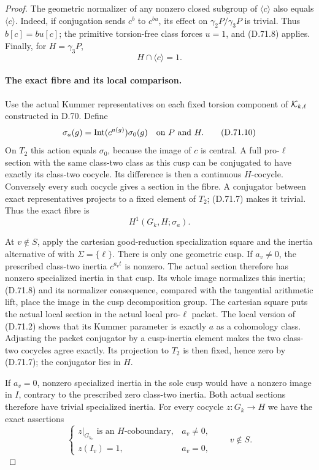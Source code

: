 \begin{proof}
The geometric normalizer of any nonzero
closed subgroup of \(\langle c\rangle\)
also equals \(\langle c\rangle\).
Indeed, if conjugation sends \(c^b\)
to \(c^{bu}\), its effect on
\(\gamma_2P/\gamma_3P\) is trivial.
Thus \(b[c]=bu[c]\); the primitive
torsion-free class forces \(u=1\),
and (D.71.8) applies.
Finally, for \(H=\gamma_3P\),
\[
                 H\cap\langle c\rangle=1.              \tag{D.71.9}
\]

\paragraph{The exact fibre and its local comparison.}
Use the actual Kummer representatives
on each fixed torsion component of
\({\cal K}_{k,\ell}\) constructed in
D.70. Define
\[
       \sigma_a(g)=\operatorname{Int}(c^{a(g)})\sigma_0(g)
                         \quad\hbox{on }P\hbox{ and }H.
                                                        \tag{D.71.10}
\]
On \(T_2\) this action equals \(\sigma_0\),
because the image of \(c\) is central.
A full pro-\(\ell\) section with the
same class-two class as this cusp can
be conjugated to have exactly its
class-two cocycle. Its difference is
then a continuous \(H\)-cocycle.
Conversely every such cocycle gives
a section in the fibre. A conjugator
between exact representatives projects
to a fixed element of \(T_2\); (D.71.7)
makes it trivial. Thus the exact fibre is
\[
                         H^1(G_k,H;\sigma_a).          \tag{D.71.11}
\]

At \(v\notin S\), apply the cartesian
good-reduction specialization square
and the inertia alternative of
\cite[Definition A.3, Remark A.3.1 and Proposition A.6]
{DE_Hoshi2012} with \(\Sigma=\{\ell\}\).
There is only one geometric cusp.
If \(a_v\ne0\), the prescribed
class-two inertia \(c^{a_v t}\)
is nonzero. The actual section
therefore has nonzero specialized
inertia in that cusp. Its whole
image normalizes this inertia;
(D.71.8) and its normalizer
consequence, compared with the
tangential arithmetic lift, place
the image in the cusp decomposition
group. The cartesian square puts
the actual local section in the
actual local pro-\(\ell\) packet.
The local version of (D.71.2)
shows that its Kummer parameter
is exactly \(a\) as a cohomology
class. Adjusting the packet
conjugator by a cusp-inertia
element makes the two class-two
cocycles agree exactly. Its
projection to \(T_2\) is then
fixed, hence zero by (D.71.7);
the conjugator lies in \(H\).

If \(a_v=0\), nonzero specialized
inertia in the sole cusp would
have a nonzero image in \(I\),
contrary to the prescribed zero
class-two inertia. Both actual
sections therefore have trivial
specialized inertia. For every
cocycle \(z:G_k\to H\) we have
the exact assertions
\[
 \begin{cases}
 z|_{G_{k_v}}\text{ is an }H\text{-coboundary},
                                  &a_v\ne0,\\
 z(I_v)=1,                        &a_v=0,
 \end{cases}\qquad v\notin S.                         \tag{D.71.12}
\]


\end{proof}
